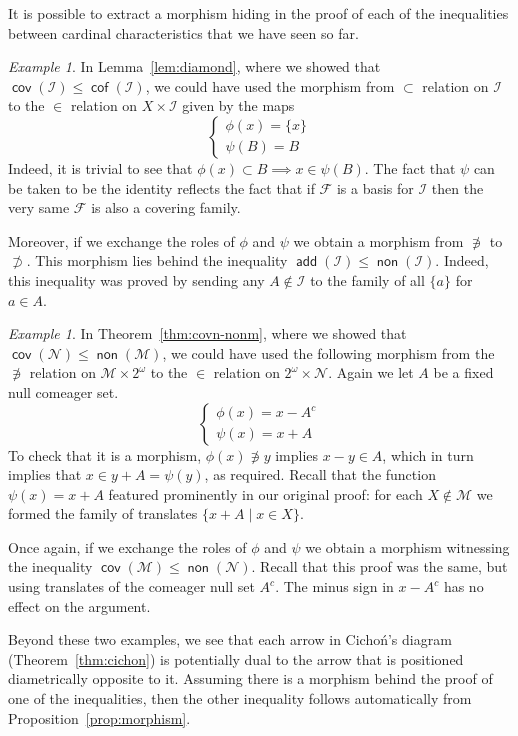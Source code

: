 \documentclass[11pt,oneside]{amsbook}
\newcommand{\Null}{\mathcal N}
\newcommand{\Meager}{\mathcal M}
\DeclareMathOperator{\add}{\mathsf{add}}
\DeclareMathOperator{\non}{\mathsf{non}}
\DeclareMathOperator{\cov}{\mathsf{cov}}
\DeclareMathOperator{\cof}{\mathsf{cof}}
\theoremstyle{definition}
\theoremstyle{plain}
\theoremstyle{definition}
\theoremstyle{remark}
\newtheorem{example}[theorem]{Example}
\numberwithin{equation}{section}
\numberwithin{figure}{section}
\begin{document}
It is possible to extract a morphism hiding in the proof of each of the inequalities between cardinal characteristics that we have seen so far.

\begin{example}
  In Lemma~\ref{lem:diamond}, where we showed that $\cov(\mathcal I)\leq\cof(\mathcal I)$, we could have used the morphism from $\subset$ relation on $\mathcal I$ to the $\in$ relation on $X\times\mathcal I$ given by the maps
  \[\begin{cases}\phi(x)=\{x\}\\\psi(B)=B\end{cases}
  \]
  Indeed, it is trivial to see that $\phi(x)\subset B\implies x\in\psi(B)$. The fact that $\psi$ can be taken to be the identity reflects the fact that if $\mathcal F$ is a basis for $\mathcal I$ then the very same $\mathcal F$ is also a covering family.

  Moreover, if we exchange the roles of $\phi$ and $\psi$ we obtain a morphism from $\not\ni$ to $\not\supset$. This morphism lies behind the inequality $\add(\mathcal I)\leq\non(\mathcal I)$. Indeed, this inequality was proved by sending any $A\notin\mathcal I$ to the family of all $\{a\}$ for $a\in A$.
\end{example}

\begin{example}
  In Theorem~\ref{thm:covn-nonm}, where we showed that $\cov(\Null)\leq\non(\Meager)$, we could have used the following morphism from the $\not\ni$ relation on $\Meager\times2^\omega$ to the $\in$ relation on $2^\omega\times\Null$. Again we let $A$ be a fixed null comeager set.
  \[\begin{cases}\phi(x)=x-A^c\\\psi(x)=x+A\end{cases}
  \]
  To check that it is a morphism, $\phi(x)\not\ni y$ implies $x-y\in A$, which in turn implies that $x\in y+A=\psi(y)$, as required. Recall that the function $\psi(x)=x+A$ featured prominently in our original proof: for each $X\notin\Meager$ we formed the family of translates $\{x+A\mid x\in X\}$.

  Once again, if we exchange the roles of $\phi$ and $\psi$ we obtain a morphism witnessing the inequality $\cov(\Meager)\leq\non(\Null)$. Recall that this proof was the same, but using translates of the comeager null set $A^c$. The minus sign in $x-A^c$ has no effect on the argument.
\end{example}

Beyond these two examples, we see that each arrow in Cicho\'n's diagram (Theorem~\ref{thm:cichon}) is potentially dual to the arrow that is positioned diametrically opposite to it. Assuming there is a morphism behind the proof of one of the inequalities, then the other inequality follows automatically from Proposition~\ref{prop:morphism}.
\end{document}
